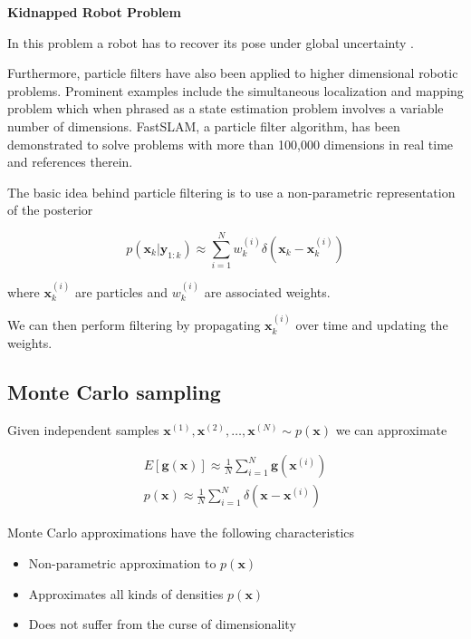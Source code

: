 \begin{framed}
\theoremstyle{remark}
\begin{remark}{\textbf{Kidnapped Robot Problem}}

In this problem a robot has to recover its pose under global uncertainty \cite{Thurn2002}.

\end{remark}
\end{framed}

Furthermore, particle filters have also been applied to higher dimensional robotic problems. Prominent examples include the
simultaneous localization and mapping problem which when phrased as a state estimation problem involves a variable number of dimensions.
FastSLAM, a particle filter algorithm, has been demonstrated to solve problems  with more than 100,000 dimensions in real time \cite{Thurn2002} and references therein.

The basic idea behind particle filtering is to use a non-parametric representation of the posterior

\begin{equation}
p(\mathbf{x}_k | \mathbf{y}_{1:k}) \approx \sum_{i=1}^N w_{k}^{(i)} \delta (\mathbf{x}_k -\mathbf{x}_{k}^{(i)})
\end{equation}

where $\mathbf{x}_{k}^{(i)}$ are particles and $w_{k}^{(i)}$ are associated weights.

We can then perform filtering by propagating $\mathbf{x}_{k}^{(i)}$ over time and
updating the weights.


\subsection{Monte Carlo sampling}
\label{monte_carlo_sampling}

Given independent samples $\mathbf{x}^{(1)}, \mathbf{x}^{(2)}, \ldots, \mathbf{x}^{(N)} \sim p(\mathbf{x})$ we can approximate

\begin{eqnarray}
E[\mathbf{g}(\mathbf{x})] \approx \frac{1}{N}\sum_{i=1}^N \mathbf{g}(\mathbf{x}^{(i)}) \\
p(\mathbf{x}) \approx \frac{1}{N}\sum_{i=1}^N \delta(\mathbf{x} - \mathbf{x}^{(i)})
\end{eqnarray}

Monte Carlo approximations have the following characteristics

\begin{itemize}
\item Non-parametric approximation to $p(\mathbf{x})$
\item Approximates all kinds of densities $p(\mathbf{x})$
\item Does not suffer from the curse of dimensionality
\end{itemize}

